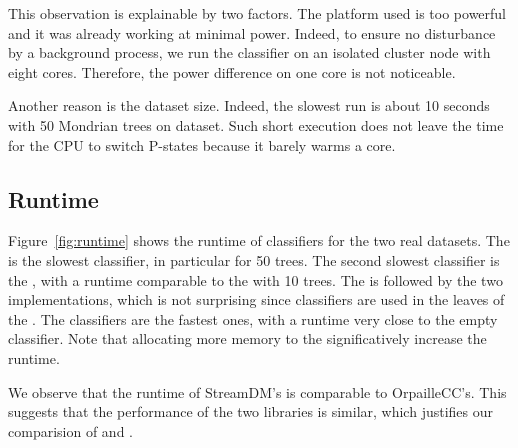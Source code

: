 This observation is explainable by two factors. The platform used is too powerful
and it was already working at minimal power. Indeed, to ensure no disturbance
by a background process, we run the classifier on an isolated cluster node with
eight cores. Therefore, the power difference on one core is not noticeable.

Another reason is the dataset size. Indeed, the slowest run is about
10 seconds with 50 Mondrian trees on \recofitdataset dataset.  Such short
execution does not leave the time for the CPU to switch P-states because it
barely warms a core.


\subsection{Runtime}
Figure~\ref{fig:runtime} shows the runtime of classifiers for the two real
datasets. The \mondrianforest is the slowest classifier, in particular for 50
trees. The second slowest classifier is the \hoeffdingtree, with a runtime
comparable to the \mondrianforest with 10 trees. The \hoeffdingtree is followed
by the two \naivebayes implementations, which is not surprising since
\naivebayes classifiers are used in the leaves of the \hoeffdingtree. The \mcnn
classifiers are the fastest ones, with a runtime very close to the empty
classifier. Note that allocating more memory to the \mondrianforest
significatively increase the runtime.

We observe that the runtime of StreamDM's \naivebayes is comparable to
OrpailleCC's. This suggests that the performance of the two libraries is
similar, which justifies our comparision of \hoeffdingtree and \mondrianforest.

